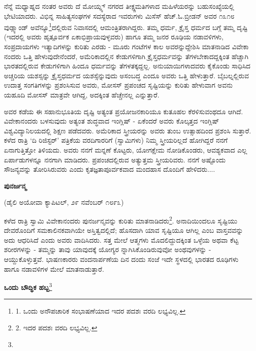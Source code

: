 ನೆನ್ನೆ ಮಧ್ಯಾಹ್ನದ ನಂತರ ಅವರು ದೆ ಮೋಯ್ನ್ಸ್ ನಗರದ ತೀಕ್ಷ್ಣಮತಿಗಳಾದ ಮಹಿಳೆಯರನ್ನು ಬಹುಸಂಖ್ಯೆಯಲ್ಲಿ ಭೇಟಿಯಾದರು. ವಿಭಿನ್ನ ಸಾಹಿತ್ಯಸಂಘಗಳ ಸದಸ್ಯೆರಾದ ಇವರುಗಳು ಮಿಸೆಸ್ ಹೆಚ್.ಓ.ಬ್ರೀಡನ್ ಅವರ ೧೩೧೮ ವುಡ್ಲ್ಯಾಂಡ್ ಅವೆನ್ಯೂ\footnote{1. ಒಂದು ಅನೌಪಚಾರಿಕ ಸಂಭಾಷಣೆಯಾದ ಇದರ ಪದಶಃ ವರದಿ ಲಭ್ಯವಿಲ್ಲ.}ದಲ್ಲಿರುವ ನಿವಾಸದಲ್ಲಿ ಆಮಂತ್ರಿತರಾಗಿದ್ದರು. ತಮ್ಮ ಧರ್ಮ, ಕ್ರೈಸ್ತ ಧರ್ಮದ ಬಗ್ಗೆ ತಮ್ಮ ದೃಷ್ಟಿ (ಇದರಲ್ಲಿ ಅವರು ಹೃತ್ಪೂರ್ವಕ ಏಕಾಭಿಪ್ರಾಯವುಳ್ಳವರು) ಹಾಗೂ ತಮ್ಮ ಜನರ ರೂಢಿಯ ನಡಾವಳಿಗಳು, ಸಂಪ್ರದಾಯಗಳು ಇತ್ಯಾದಿಗಳನ್ನು ಕುರಿತು ಎರಡು - ಮೂರು ಗಂಟೆಗಳ ಕಾಲ ಅವರನ್ನುದ್ದೇಶಿಸಿ ಮಾತನಾಡಿದ ವಿವೇಕಾ ನಂದರು ಒತ್ತಿ ಹೇಳುವುದೇನೆಂದರೆ, ಅಮೆರಿಕಾದಲ್ಲಿನ ಕೇಡುಗಳಿಗಾಗಿ ಕ್ರೈಸ್ತಧರ್ಮವನ್ನು ತೆಗಳಬೇಕಾದದ್ದಕ್ಕಿಂತ ಹೆಚ್ಚಾಗಿ ಭಾರತದಲ್ಲಿರುವ ಕೇಡುಗಳಿಗಾಗಿ ಹಿಂದೂ ಧರ್ಮವನ್ನು ತೆಗಳತಕ್ಕದ್ದಲ್ಲ. ಅನುಯಾಯಿಗಳಾದವರು ಕೈಕೊಂಡು ಸಾಧಿಸಿದ ಅಚ್ಚರಿಯ ಯಶಸ್ಸನ್ನು ಕ್ರೈಸ್ತಧರ್ಮದ ಯಶಸ್ಸೆನ್ನುವುದು ಅಸಂಬದ್ಧ ಎಂದೂ ಅವರು ಒತ್ತಿ ಹೇಳುತ್ತಾರೆ. ಬೈಬಲ್ನಲ್ಲಿರುವ ಉದಾತ್ತ ಸಂಗತಿಗಳನ್ನು ಪ್ರಶಂಸಿಸುವ ಅವರು, ಮೋಸಸ್ ಪ್ರಪಂಚದ ಸೃಷ್ಟಿಯನ್ನು ಕುರಿತು ಹೇಳುವಾಗ ಅವನು ಯಹೂದಿ ಮೋಸಸ್ ಮಾತ್ರವೇ ಆಗಿದ್ದ, ಅದಕ್ಕಿಂತ ಹೆಚ್ಚೇನಲ್ಲ ಎನ್ನುತ್ತಾರೆ.

ಅವರ ಕಡೆಯ ಈ ಸಹಾನುಭೂತಿಯ ದೃಷ್ಟಿ ಅತ್ಯಂತ ಪ್ರಯೋಜನಕಾರಿಯೂ ಕುತೂಹಲ ಕೆರಳಿಸುವಂಥದೂ ಆಗಿದೆ. ವಿವೇಕಾನಂದರು ಬಳಸುವುದು ಅತ್ಯಂತ ಶುದ್ಧವಾದ ಇಂಗ್ಲಿಷ್ - ಏಕೆಂದರೆ ಅವರು ಕೊಲ್ಕತ್ತದ ಇಂಗ್ಲಿಷ್ ವಿಶ್ವವಿದ್ಯಾನಿಲಯದಲ್ಲಿ ಶಿಕ್ಷಣ ಪಡೆದವರು. ಅಮೆರಿಕಾದ ಸ್ತ್ರೀಯರನ್ನು ಅವರು ತುಂಬ ಉತ್ಸಾಹದಿಂದ ಪ್ರಶಂಸಿ ಸುತ್ತಾರೆ. ಕಳೆದ ರಾತ್ರಿ ‘ದಿ ರಿಜಿಸ್ಟರ್’ ಪತ್ರಿಕೆಯ ವರದಿಗಾರರಿಗೆ (ಸ್ವಾಮಿಗಳು) ನಿಮ್ಮ ಸ್ತ್ರೀಯರಿಲ್ಲದೆ ಹೋಗಿದ್ದರೆ ನನಗೆ ಏನಾಗುತ್ತಿತ್ತೋ ತಿಳಿಯದು. ಅವರು ನನಗೆ ಮನ್ನಣೆ ಕೊಟ್ಟರು, ಯೋಗಕ್ಷೇಮ ನೋಡಿಕೊಂಡರು, ಆವಶ್ಯಕವಾದ ಎಲ್ಲ ಏರ್ಪಾಡುಗಳನ್ನೂ ನನಗಾಗಿ ಮಾಡಿದರು. ಪ್ರಪಂಚದಲ್ಲಿರುವ ಅತ್ಯುತ್ತಮ ಸ್ತ್ರೀಯರಿವರು. ನನಗೆ ಅಷ್ಟೊಂದು ಸೌಜನ್ಯವನ್ನು ತೋರಿಸಿರುವರು ಎಂದು ಕೃತಜ್ಞತಾಪೂರ್ವಕವಾದ ಮಂದಹಾಸ ದೊಂದಿಗೆ ಹೇಳಿದರು....

\begin{center}
\textbf{ಪುನರ್ಜನ್ಮ}
\end{center}

\begin{center}
(ಡೈಲಿ ಅಯೋವಾ ಕ್ಯಾಪಿಟಲ್, ೨೯ ನವೆಂಬರ್ ೧೮೯೩)
\end{center}

ಕಳೆದ ರಾತ್ರಿ ಸ್ವಾಮಿ ವಿವೇಕಾನಂದರು ಪುನರ್ಜನ್ಮವನ್ನು ಕುರಿತು ಮಾತನಾಡಿದರು\footnote{2. ಇದರ ಪದಶಃ ವರದಿ ಲಭ್ಯವಿಲ್ಲ.}. ಅನಾದಿಯಿಂದಲೂ ಸೃಷ್ಟಿಯು ದೇವರೊಂದಿಗೆ ಸಮಕಾಲಿನಕವಾಗಿಯೇ ಅಸ್ತಿತ್ವದಲ್ಲಿದೆ; ಹೊಸದಾಗಿ ಯಾವ ಸೃಷ್ಟಿಯೂ ಆಗಿಲ್ಲ ಎಂಬ ವಾಸ್ತವವನ್ನು ಅದು ಆಧರಿಸಿದೆ ಎಂದು ಅವರು ವಾದಿಸಿದರು. ಸತ್ತ ಮೇಲೆ ಆತ್ಮಗಳು ಮೊದಲಿದ್ದುದಕ್ಕಿಂತ ಒಳ್ಳೆಯ ಅಥವಾ ಕೆಟ್ಟ ಶರೀರಗಳನ್ನು - ತಮ್ಮನ್ನು ತಾವು ಯಾವುದಕ್ಕೆ ಯೋಗ್ಯರ ನ್ನಾಗಿಸಿಕೊಂಡಿರುವುವೋ ಅಂಥವುಗಳನ್ನು - ಆಯ್ದುಕೊಳ್ಳುತ್ತವೆ. ಭಾಷಣಕಾರರು ವಂದನಾರ್ಪಣೆಯ ದಿನ  ದಂದು ಸಂಜೆ ಇದೇ ಸ್ಥಳದಲ್ಲಿ ಭಾರತದ ರೂಢಿಗಳು ಹಾಗೂ ನಡಾವಳಿಗಳ ಮೇಲೆ ಮಾತನಾಡುತ್ತಾರೆ.

\begin{center}
\textbf{ಒಂದು ಬೌದ್ಧಿಕ ಹಬ್ಬ}\footnote{}
\end{center}

